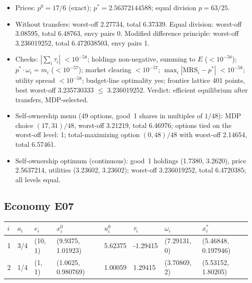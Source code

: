 \begin{itemize}[leftmargin=1.2em,itemsep=0pt,topsep=2pt]\footnotesize
\item Prices: $p^0 = 17/6$ (exact); $p^* = 2.56372144588$; equal division $p = 63/25$.
\item Without transfers: worst-off 2.27734, total 6.37339. Equal division: worst-off 3.08595, total 6.48763, envy pairs 0. Modified difference principle: worst-off 3.236019252, total 6.472038503, envy pairs 1.
\item Checks: $|\sum_i\tau_i|$ $<10^{-58}$; holdings non-negative, summing to $E$ ($<10^{-58}$); $p^*\cdot\omega_i = m_i$ ($<10^{-57}$); market clearing $<10^{-57}$; $\max_i|\mathrm{MRS}_i - p^*|$ $<10^{-58}$; utility spread $<10^{-58}$; budget-line optimality yes; frontier lattice 401 points, best worst-off 3.235730333 $\leq$ 3.236019252. Verdict: efficient equilibrium after transfers, MDP-selected.
\item Self-ownership menu (49 options, good~1 shares in multiples of $1/48$): MDP choice $(17, 31)/48$, worst-off 3.21219, total 6.46976; options tied on the worst-off level: 1; total-maximizing option $(0, 48)/48$ with worst-off 2.14654, total 6.57461.
\item Self-ownership optimum (continuous): good~1 holdings (1.7380, 3.2620), price 2.5637214, utilities (3.23602, 3.23602); worst-off 3.236019252, total 6.4720385; all levels equal.
\end{itemize}

\subsection*{Economy E07}
\label{ec:E07}
{\scriptsize\setlength{\tabcolsep}{3pt}
\begin{tabular}{@{}llllllll@{}}
\toprule
$i$ & $a_i$ & $e_i$ & $x^0_i$ & $u^0_i$ & $\tau_i$ & $\omega_i$ & $x^*_i$ \\
\midrule
1 & 3/4 & (10, 1) & (9.9375, 1.01923) & 5.62375 & -1.29415 & (7.29131, 0) & (5.46848, 0.197946) \\
2 & 1/4 & (1, 1) & (1.0625, 0.980769) & 1.00059 & 1.29415 & (3.70869, 2) & (5.53152, 1.80205) \\
\bottomrule\end{tabular}}

